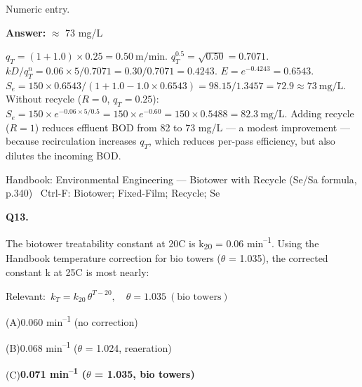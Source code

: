 \documentclass[11pt]{article}
\newcommand{\correct}[1]{\textbf{#1}\;{\color{accent}$\checkmark$}}
\newcommand{\optline}[2]{\par\noindent\hspace{1.2em}(#1)\hspace{0.6em}#2}
\begin{document}
{\small\color{soft}Numeric entry.}\par\vspace{3pt}
\vspace{2pt}\par\noindent\colorbox{boxbg}{\parbox{\dimexpr\linewidth-2\fboxsep\relax}{%
\vspace{2pt}\textbf{Answer:} $\approx$ 73 mg/L\par\vspace{2pt}
{\small $q_T = (1+1.0)\times0.25 = 0.50\ \mathrm{m/min}$.  $q_T^{0.5} = \sqrt{0.50} = 0.7071$.  $kD/q_T^n = 0.06\times5/0.7071 = 0.30/0.7071 = 0.4243$.  $E = e^{-0.4243} = 0.6543$.  $S_e = 150\times0.6543/(1+1.0-1.0\times0.6543) = 98.15/1.3457 = 72.9\approx73\ \mathrm{mg/L}$. Without recycle ($R=0$, $q_T=0.25$): $S_e = 150\times e^{-0.06\times5/0.5} = 150\times e^{-0.60} = 150\times0.5488 = 82.3\ \mathrm{mg/L}$. Adding recycle ($R=1$) reduces effluent BOD from 82 to 73 mg/L --- a modest improvement --- because recirculation increases $q_T$, which reduces per-pass efficiency, but also dilutes the incoming BOD.}\par\vspace{2pt}
{\footnotesize\color{soft}Handbook: Environmental Engineering --- Biotower with Recycle (Se/Sa formula, p.340) \textbullet\ Ctrl-F: Biotower; Fixed-Film; Recycle; Se}\vspace{2pt}
}}
\vspace{9pt}
\filbreak
\textbf{\color{accent}Q13.}\quad {\small\color{soft}[D8-Q13 \textbullet\ MCQ \textbullet\ Biotower treatability constant --- temperature correction ($\theta$ = 1.035)]}\par\vspace{2pt}
The biotower treatability constant at 20\textdegree{}C is k\textsubscript{2}\textsubscript{0} = 0.06 min\textsuperscript{--}\textsuperscript{1}. Using the Handbook temperature correction for bio towers ($\theta$ = 1.035), the corrected constant k at 25\textdegree{}C is most nearly:\par\vspace{3pt}
{\small\color{soft}Relevant:}\ $k_T = k_{20}\,\theta^{T-20},\quad \theta = 1.035\ (\text{bio towers})$\par\vspace{3pt}
\optline{A}{0.060 min\textsuperscript{--}\textsuperscript{1}  (no correction)}
\optline{B}{0.068 min\textsuperscript{--}\textsuperscript{1}  ($\theta$ = 1.024, reaeration)}
\optline{C}{\correct{0.071 min\textsuperscript{--}\textsuperscript{1}  ($\theta$ = 1.035, bio towers)}}
\end{document}
